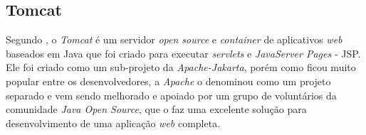 \subsection{Tomcat}

\par Segundo , o \textit{Tomcat} é um
servidor \textit{open source} e \textit{container} de aplicativos \textit{web}
baseados em Java que foi criado para executar \textit{servlets} e \textit{JavaServer
Pages} - JSP\footnotemark[4].
Ele foi criado como um sub-projeto da \textit{Apache-Jakarta}, porém como ficou
muito popular entre os desenvolvedores, a \textit{Apache} o denominou como um
projeto separado e vem sendo melhorado e apoiado por um grupo de voluntários da comunidade \textit{Java Open
Source}, que o faz uma excelente solução para desenvolvimento de uma aplicação
\textit{web} completa. 




